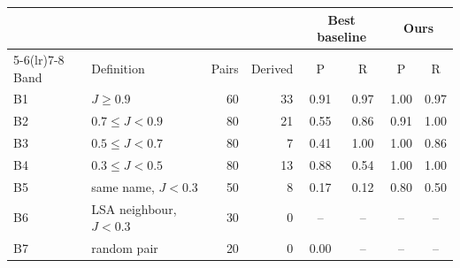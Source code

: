 \begin{tabular}{llrrcccc}
\toprule
 & & & & \multicolumn{2}{c}{Best baseline} & \multicolumn{2}{c}{Ours} \\
\cmidrule(lr){5-6}\cmidrule(lr){7-8}
Band & Definition & Pairs & Derived & P & R & P & R \\
\midrule
B1 & $J \geq 0.9$ & 60 & 33 & 0.91 & 0.97 & 1.00 & 0.97 \\
B2 & $0.7 \leq J < 0.9$ & 80 & 21 & 0.55 & 0.86 & 0.91 & 1.00 \\
B3 & $0.5 \leq J < 0.7$ & 80 & 7 & 0.41 & 1.00 & 1.00 & 0.86 \\
B4 & $0.3 \leq J < 0.5$ & 80 & 13 & 0.88 & 0.54 & 1.00 & 1.00 \\
B5 & same name, $J<0.3$ & 50 & 8 & 0.17 & 0.12 & 0.80 & 0.50 \\
B6 & LSA neighbour, $J<0.3$ & 30 & 0 & -- & -- & -- & -- \\
B7 & random pair & 20 & 0 & 0.00 & -- & -- & -- \\
\bottomrule
\end{tabular}
